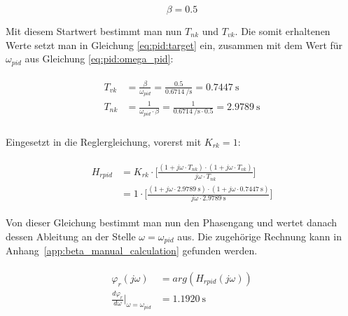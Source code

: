 \begin{equation} \label{eq:pid:beta:initial_value}
    \beta = 0.5
\end{equation}

Mit  diesem Startwert  bestimmt  man nun  $T_{nk}$  und ${T_{vk}}$. Die  somit
erhaltenen Werte setzt man in  Gleichung \ref{eq:pid:target} ein, zusammen mit
dem Wert f\"ur $\omega_{pid}$ aus Gleichung \ref{eq:pid:omega_pid}:

\begin{gather} \label{eq:pid:t_nk_t_vk_initial_results}
    \begin{split}
        {T_{vk}} & = \frac{\beta}{\omega_{pid}}  = \frac{0.5}{\SI{0.6714}{\per\second}}                   = \SI{0.7447}{\second} \\
        {T_{nk}} & = \frac{1}{\omega_{pid} \cdot \beta} = \frac{1}{\SI{0.6714}{\per\second} \cdot 0.5 }  = \SI{2.9789}{\second} \\
    \end{split}
\end{gather}

Eingesetzt in die Reglergleichung, vorerst mit $K_{rk} = 1$:

\begin{gather} \label{eq:pid:t_nk_t_vk_initial_results}
    \begin{split}
        H_{rpid} & = K_{rk} \cdot \biggl[ \frac{(1 + j\omega \cdot T_{nk}) \cdot (1 + j\omega \cdot T_{vk}) }{ j\omega \cdot T_{nk} } \biggr] \\
                 & = 1      \cdot \biggl[ \frac{(1 + j\omega \cdot \SI{2.9789}{\second}) \cdot (1 + j\omega \cdot \SI{0.7447}{\second}) }{ j\omega \cdot  \SI{2.9789}{\second}} \biggr]
    \end{split}
\end{gather}

Von dieser Gleichung bestimmt man nun  den Phasengang und wertet danach dessen
Ableitung an der Stelle $\omega = \omega_{pid}$ aus. Die zugeh\"orige Rechnung
kann in Anhang~\ref{app:beta_manual_calculation} gefunden werden.

\begin{gather} \label{eq:pid:phi_r_first_iteration}
    \begin{split}
        \varphi_r (j\omega)                                            & = arg(H_{rpid}(j\omega))        \\
        \frac{d\varphi_r}{d\omega} \biggr \rvert_{\omega=\omega_{pid}} & = \SI{1.1920}{\second}
    \end{split}
\end{gather}


